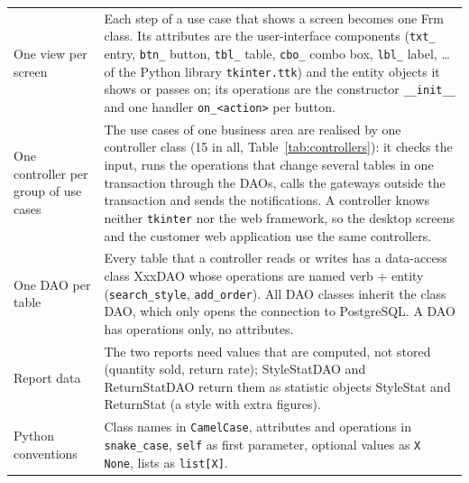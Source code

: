 {\begin{xltabular}{\textwidth}{@{}L{3.6cm} Y@{}}
One view per screen & Each step of a use case that shows a screen becomes one \textsf{Frm} class. Its attributes are the user-interface components (\texttt{txt\_} entry, \texttt{btn\_} button, \texttt{tbl\_} table, \texttt{cbo\_} combo box, \texttt{lbl\_} label, \ldots{} of the Python library \texttt{tkinter.ttk}) and the entity objects it shows or passes on; its operations are the constructor \texttt{\_\_init\_\_} and one handler \texttt{on\_<action>} per button. \\
One controller per group of use cases & The use cases of one business area are realised by one controller class (15 in all, Table~\ref{tab:controllers}): it checks the input, runs the operations that change several tables in one transaction through the DAOs, calls the gateways outside the transaction and sends the notifications. A controller knows neither \texttt{tkinter} nor the web framework, so the desktop screens and the customer web application use the same controllers. \\
One DAO per table & Every table that a controller reads or writes has a data-access class \textsf{XxxDAO} whose operations are named verb + entity (\texttt{search\_style}, \texttt{add\_order}). All DAO classes inherit the class \textsf{DAO}, which only opens the connection to PostgreSQL. A DAO has operations only, no attributes. \\
Report data & The two reports need values that are computed, not stored (quantity sold, return rate); \textsf{StyleStatDAO} and \textsf{ReturnStatDAO} return them as statistic objects \textsf{StyleStat} and \textsf{ReturnStat} (a style with extra figures). \\
Python conventions & Class names in \texttt{CamelCase}, attributes and operations in \texttt{snake\_case}, \texttt{self} as first parameter, optional values as \texttt{X \textbar{} None}, lists as \texttt{list[X]}. \\
\end{xltabular}
}

